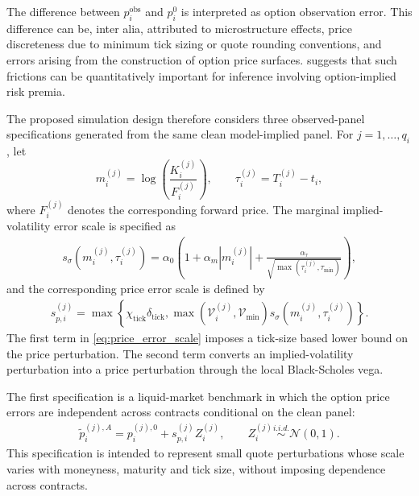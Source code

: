 \documentclass[11pt,a4paper,notitlepage]{article}
\numberwithin{equation}{section}
\begin{document}
The difference between $p_i^{\mathrm{obs}}$ and $p_i^{0}$ is interpreted as option observation error.
This difference can be, inter alia, attributed to microstructure effects, price discreteness due to minimum
tick sizing or quote rounding conventions, and errors arising from the construction of option price surfaces.
\citet{duarte2024very} suggests that such frictions can be quantitatively important for inference involving
option-implied risk premia.

The proposed simulation design therefore considers three observed-panel specifications generated from the same
clean model-implied panel. For $j=1,\ldots,q_i$, let
\[
m_i^{(j)}=\log\left(\frac{K_i^{(j)}}{F_i^{(j)}}\right),
\qquad
\tau_i^{(j)}=T_i^{(j)}-t_i,
\]
where $F_i^{(j)}$ denotes the corresponding forward price. The marginal implied-volatility error scale is
specified as
\begin{align}
s_\sigma(m_i^{(j)},\tau_i^{(j)})
=
\alpha_0\left(
1+\alpha_m |m_i^{(j)}|
+\frac{\alpha_\tau}{\sqrt{\max(\tau_i^{(j)},\tau_{\min})}}
\right),
\label{eq:iv_error_scale}
\end{align}
and the corresponding price error scale is defined by
\begin{align}
s_{p,i}^{(j)}
=
\max\left\{
\chi_{\mathrm{tick}}\delta_{\mathrm{tick}},
\max\left(\mathcal{V}_i^{(j)},\mathcal{V}_{\min}\right)
s_\sigma(m_i^{(j)},\tau_i^{(j)})
\right\}.
\label{eq:price_error_scale}
\end{align}
The first term in \eqref{eq:price_error_scale} imposes a tick-size based lower bound on the price perturbation.
The second term converts an implied-volatility perturbation into a price perturbation through the local Black-Scholes
vega.

The first specification is a liquid-market benchmark in which the option price errors are independent across
contracts conditional on the clean panel:
\begin{align}
\tilde p_i^{(j),A}
=
p_i^{(j),0}+s_{p,i}^{(j)} Z_i^{(j)},
\qquad
Z_i^{(j)}\overset{i.i.d.}{\sim}\mathcal{N}(0,1).
\label{eq:noise_liquid}
\end{align}
This specification is intended to represent small quote perturbations whose scale varies with moneyness, maturity
and tick size, without imposing dependence across contracts.
\end{document}
